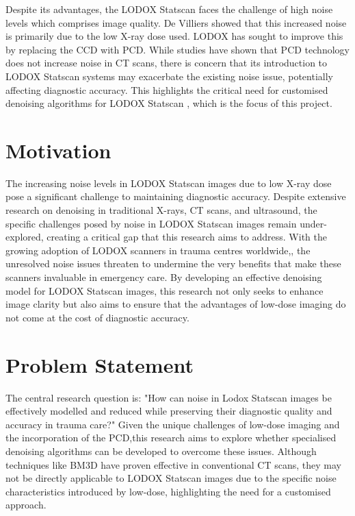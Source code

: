 Despite its advantages, the LODOX\textsuperscript{\textregistered} Statscan\textsuperscript{\textregistered} faces the challenge of high noise levels which comprises image quality. De Villiers showed that this increased noise is primarily due to the low X-ray dose used\cite{PhDMattieu}. LODOX\textsuperscript{\textregistered} has sought to improve this by replacing the \gls{CCD} with \gls{PCD}\cite{ProjectBrief}. While studies have shown that \gls{PCD} technology does not increase noise in \gls{CT} scans\cite{huber_dedicated_2022}, there is concern that its introduction to LODOX\textsuperscript{\textregistered} Statscan\textsuperscript{\textregistered} systems may exacerbate the existing noise issue, potentially affecting diagnostic accuracy. This highlights the critical need for customised denoising algorithms for LODOX\textsuperscript{\textregistered} Statscan\textsuperscript{\textregistered} , which is the focus of this project.




\section{Motivation}
The increasing noise levels in LODOX\textsuperscript{\textregistered} Statscan\textsuperscript{\textregistered} images due to low X-ray dose pose a significant challenge to maintaining diagnostic accuracy\cite{PhDMattieu}.  Despite extensive research on denoising in traditional X-rays, CT scans, and ultrasound, the specific challenges posed by noise in LODOX\textsuperscript{\textregistered} Statscan\textsuperscript{\textregistered} images remain under-explored, creating a critical gap that this research aims to address. With the growing adoption of LODOX scanners in trauma centres worldwide\cite{noauthor_full-body_nodate},\cite{evangelopoulos_personal_2009}, the unresolved noise issues threaten to undermine the very benefits that make these scanners invaluable in emergency care. By developing an effective denoising model for LODOX\textsuperscript{\textregistered} Statscan\textsuperscript{\textregistered} images, this research not only seeks to enhance image clarity but also aims to ensure that the advantages of low-dose imaging do not come at the cost of diagnostic accuracy.

\section{Problem Statement}
The central research question is: "How can noise in Lodox Statscan images be effectively modelled and reduced while preserving  their diagnostic quality and accuracy in trauma care?" Given the unique challenges of low-dose imaging and the incorporation of the \gls{PCD},this research aims to explore whether specialised denoising algorithms can be developed to overcome these issues. Although techniques like BM3D have proven effective in conventional \gls{CT} scans\cite{harrison_multichannel_2017}, they may not be directly applicable to LODOX\textsuperscript{\textregistered} Statscan\textsuperscript{\textregistered} images due to the specific noise characteristics introduced by low-dose, highlighting the need for a customised approach.




